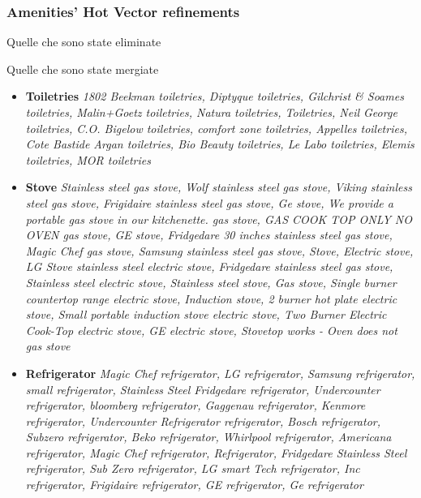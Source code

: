 \subsubsection{Amenities' Hot Vector refinements}
Quelle che sono state eliminate


Quelle che sono state mergiate

\begin{itemize}
	\item \textbf{Toiletries} \textrightarrow \textit{1802 Beekman toiletries, Diptyque toiletries, Gilchrist \& Soames toiletries, Malin+Goetz toiletries, Natura toiletries, Toiletries, Neil George toiletries, C.O. Bigelow toiletries,  comfort zone  toiletries, Appelles toiletries, Cote Bastide Argan toiletries, Bio Beauty toiletries, Le Labo toiletries, Elemis toiletries, MOR toiletries}
	\item \textbf{Stove} \textrightarrow \textit{Stainless steel gas stove, Wolf stainless steel gas stove, Viking stainless steel gas stove, Frigidaire stainless steel gas stove, Ge stove, We provide a portable gas stove in our kitchenette.  gas stove, GAS COOK TOP ONLY NO OVEN gas stove, GE stove, Fridgedare 30 inches stainless steel gas stove, Magic Chef  gas stove, Samsung stainless steel gas stove, Stove, Electric stove, LG Stove stainless steel electric stove, Fridgedare stainless steel gas stove, Stainless steel electric stove, Stainless steel stove, Gas stove, Single burner countertop range electric stove, Induction stove, 2 burner hot plate electric stove, Small portable induction stove  electric stove, Two Burner Electric Cook-Top electric stove, GE  electric stove, Stovetop works - Oven does not gas stove}
	\item \textbf{Refrigerator} \textrightarrow \textit{Magic Chef refrigerator, LG refrigerator, Samsung refrigerator, small  refrigerator, Stainless Steel Fridgedare refrigerator, Undercounter refrigerator, bloomberg refrigerator, Gaggenau refrigerator, Kenmore refrigerator, Undercounter Refrigerator refrigerator, Bosch refrigerator, Subzero refrigerator, Beko refrigerator, Whirlpool refrigerator, Americana refrigerator, Magic Chef  refrigerator, Refrigerator, Fridgedare Stainless Steel refrigerator, Sub Zero refrigerator, LG smart Tech refrigerator, Inc refrigerator, Frigidaire refrigerator, GE refrigerator, Ge refrigerator}

\end{itemize}

